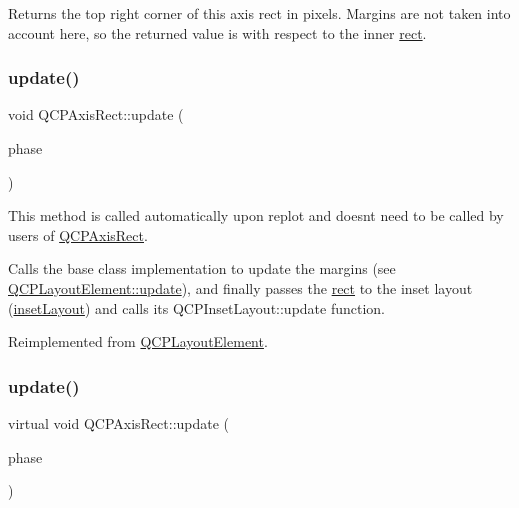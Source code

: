 Returns the top right corner of this axis rect in pixels. Margins are not taken into account here, so the returned value is with respect to the inner \hyperlink{class_q_c_p_layout_element_a208effccfe2cca4a0eaf9393e60f2dd4}{rect}. \mbox{\label{class_q_c_p_axis_rect_add049d464b9ef2ccdc638adc4ccb4aca}} 
\subsubsection{\texorpdfstring{update()}{update()}\hspace{0.1cm}{\footnotesize\ttfamily [1/2]}}
{\footnotesize\ttfamily void Q\+C\+P\+Axis\+Rect\+::update (\begin{DoxyParamCaption}\item[{\hyperlink{class_q_c_p_layout_element_a0d83360e05735735aaf6d7983c56374d}{Update\+Phase}}]{phase }\end{DoxyParamCaption})\hspace{0.3cm}{\ttfamily [virtual]}}

This method is called automatically upon replot and doesn\textquotesingle{}t need to be called by users of \hyperlink{class_q_c_p_axis_rect}{Q\+C\+P\+Axis\+Rect}.

Calls the base class implementation to update the margins (see \hyperlink{class_q_c_p_layout_element_a929c2ec62e0e0e1d8418eaa802e2af9b}{Q\+C\+P\+Layout\+Element\+::update}), and finally passes the \hyperlink{class_q_c_p_layout_element_a208effccfe2cca4a0eaf9393e60f2dd4}{rect} to the inset layout (\hyperlink{class_q_c_p_axis_rect_a949f803466619924c7018df4b511ae10}{inset\+Layout}) and calls its Q\+C\+P\+Inset\+Layout\+::update function.

Reimplemented from \hyperlink{class_q_c_p_layout_element_a929c2ec62e0e0e1d8418eaa802e2af9b}{Q\+C\+P\+Layout\+Element}.

\mbox{\label{class_q_c_p_axis_rect_a8c9f5555c257955648465e8293adb7ef}} 
\subsubsection{\texorpdfstring{update()}{update()}\hspace{0.1cm}{\footnotesize\ttfamily [2/2]}}
{\footnotesize\ttfamily virtual void Q\+C\+P\+Axis\+Rect\+::update (\begin{DoxyParamCaption}\item[{\hyperlink{class_q_c_p_layout_element_a0d83360e05735735aaf6d7983c56374d}{Update\+Phase}}]{phase }\end{DoxyParamCaption})\hspace{0.3cm}{\ttfamily [virtual]}}

